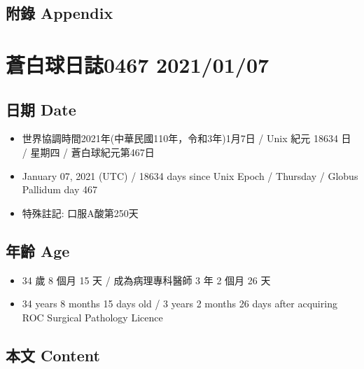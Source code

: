 \documentclass[a5paper, 11pt
]{book}
\providecommand{\tightlist}{%
  \setlength{\itemsep}{0pt}\setlength{\parskip}{0pt}}
\begin{document}
\hypertarget{ux9644ux9304-appendix-36}{%
\subsection{附錄 Appendix}\label{ux9644ux9304-appendix-36}}

\hypertarget{ux84bcux767dux7403ux65e5ux8a8c0467-20210107}{%
\section{蒼白球日誌0467
2021/01/07}\label{ux84bcux767dux7403ux65e5ux8a8c0467-20210107}}

\hypertarget{ux65e5ux671f-date-37}{%
\subsection{日期 Date}\label{ux65e5ux671f-date-37}}

\begin{itemize}
\tightlist
\item
  世界協調時間2021年(中華民國110年，令和3年)1月7日 / Unix 紀元 18634 日
  / 星期四 / 蒼白球紀元第467日
\item
  January 07, 2021 (UTC) / 18634 days since Unix Epoch / Thursday /
  Globus Pallidum day 467
\item
  特殊註記: 口服A酸第250天
\end{itemize}

\hypertarget{ux5e74ux9f61-age-37}{%
\subsection{年齡 Age}\label{ux5e74ux9f61-age-37}}

\begin{itemize}
\tightlist
\item
  34 歲 8 個月 15 天 / 成為病理專科醫師 3 年 2 個月 26 天
\item
  34 years 8 months 15 days old / 3 years 2 months 26 days after
  acquiring ROC Surgical Pathology Licence
\end{itemize}

\hypertarget{ux672cux6587-content-37}{%
\subsection{本文 Content}\label{ux672cux6587-content-37}}
\end{document}
